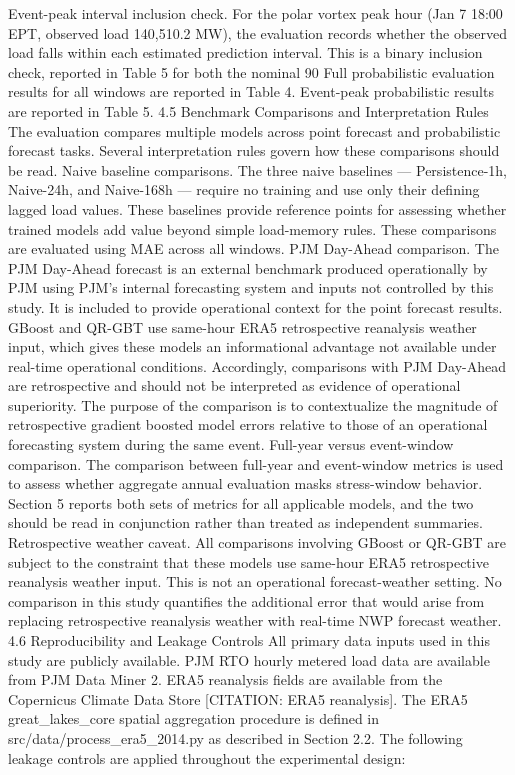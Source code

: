 Event-peak interval inclusion check. For the polar vortex peak hour (Jan 7 18:00 EPT, observed load 140,510.2 MW), the evaluation records whether the observed load falls within each estimated prediction interval. This is a binary inclusion check, reported in Table 5 for both the nominal 90%
Full probabilistic evaluation results for all windows are reported in Table 4. Event-peak probabilistic results are reported in Table 5.
4.5 Benchmark Comparisons and Interpretation Rules
The evaluation compares multiple models across point forecast and probabilistic forecast tasks. Several interpretation rules govern how these comparisons should be read.
Naive baseline comparisons. The three naive baselines — Persistence-1h, Naive-24h, and Naive-168h — require no training and use only their defining lagged load values. These baselines provide reference points for assessing whether trained models add value beyond simple load-memory rules. These comparisons are evaluated using MAE across all windows.
PJM Day-Ahead comparison. The PJM Day-Ahead forecast is an external benchmark produced operationally by PJM using PJM's internal forecasting system and inputs not controlled by this study. It is included to provide operational context for the point forecast results. GBoost and QR-GBT use same-hour ERA5 retrospective reanalysis weather input, which gives these models an informational advantage not available under real-time operational conditions. Accordingly, comparisons with PJM Day-Ahead are retrospective and should not be interpreted as evidence of operational superiority. The purpose of the comparison is to contextualize the magnitude of retrospective gradient boosted model errors relative to those of an operational forecasting system during the same event.
Full-year versus event-window comparison. The comparison between full-year and event-window metrics is used to assess whether aggregate annual evaluation masks stress-window behavior. Section 5 reports both sets of metrics for all applicable models, and the two should be read in conjunction rather than treated as independent summaries.
Retrospective weather caveat. All comparisons involving GBoost or QR-GBT are subject to the constraint that these models use same-hour ERA5 retrospective reanalysis weather input. This is not an operational forecast-weather setting. No comparison in this study quantifies the additional error that would arise from replacing retrospective reanalysis weather with real-time NWP forecast weather.
4.6 Reproducibility and Leakage Controls
All primary data inputs used in this study are publicly available. PJM RTO hourly metered load data are available from PJM Data Miner 2. ERA5 reanalysis fields are available from the Copernicus Climate Data Store [CITATION: ERA5 reanalysis]. The ERA5 great_lakes_core spatial aggregation procedure is defined in src/data/process_era5_2014.py as described in Section 2.2.
The following leakage controls are applied throughout the experimental design:


